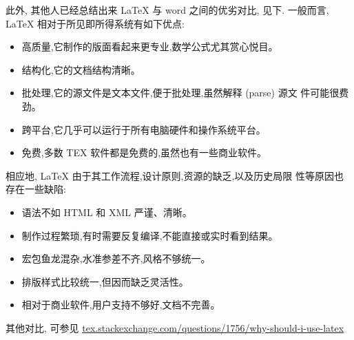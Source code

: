 \documentclass{article}
\begin{document}
此外, 其他人已经总结出来 {\LaTeX} 与 word 之间的优劣对比, 见下.
一般而言, {\LaTeX} 相对于所见即所得系统有如下优点:
\begin{itemize}
  \item 高质量,它制作的版面看起来更专业,数学公式尤其赏心悦目。
  \item 结构化,它的文档结构清晰。
  \item 批处理,它的源文件是文本文件,便于批处理,虽然解释 (parse) 源文
    件可能很费劲。
  \item 跨平台,它几乎可以运行于所有电脑硬件和操作系统平台。
  \item 免费,多数 TEX 软件都是免费的,虽然也有一些商业软件。
\end{itemize}
相应地, {\LaTeX} 由于其工作流程,设计原则,资源的缺乏,以及历史局限
性等原因也存在一些缺陷:
\begin{itemize}
  \item 语法不如 HTML 和 XML 严谨、清晰。
  \item 制作过程繁琐,有时需要反复编译,不能直接或实时看到结果。
  \item 宏包鱼龙混杂,水准参差不齐,风格不够统一。
  \item 排版样式比较统一,但因而缺乏灵活性。
  \item 相对于商业软件,用户支持不够好,文档不完善。
\end{itemize}
其他对比, 可参见 \url{tex.stackexchange.com/questions/1756/why-should-i-use-latex}
\end{document}
